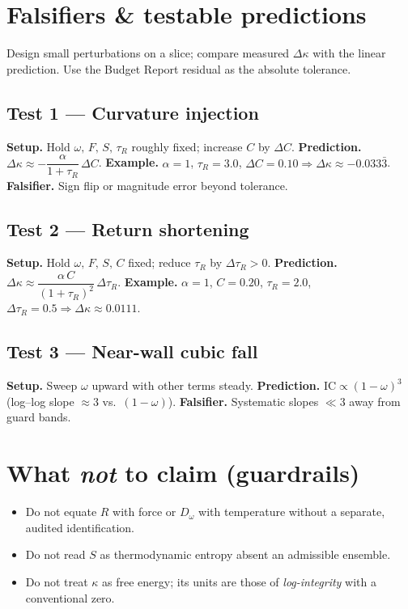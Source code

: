\section{Falsifiers \& testable predictions}
Design small perturbations on a slice; compare measured $\Delta\kappa$ with the linear prediction. Use the Budget Report residual as the absolute tolerance.

\subsection*{Test 1 — Curvature injection}
\textbf{Setup.} Hold $\omega,\,F,\,S,\,\tau_R$ roughly fixed; increase $C$ by $\Delta C$.  
\textbf{Prediction.} $\Delta\kappa \approx -\dfrac{\alpha}{1+\tau_R}\,\Delta C$.  
\textbf{Example.} $\alpha=1$, $\tau_R=3.0$, $\Delta C=0.10 \Rightarrow \Delta\kappa \approx -0.033\bar{3}$.  
\textbf{Falsifier.} Sign flip or magnitude error beyond tolerance.

\subsection*{Test 2 — Return shortening}
\textbf{Setup.} Hold $\omega,\,F,\,S,\,C$ fixed; reduce $\tau_R$ by $\Delta\tau_R>0$.  
\textbf{Prediction.} $\Delta\kappa \approx \dfrac{\alpha\,C}{(1+\tau_R)^2}\,\Delta\tau_R$.  
\textbf{Example.} $\alpha=1$, $C=0.20$, $\tau_R=2.0$, $\Delta\tau_R=0.5 \Rightarrow \Delta\kappa \approx 0.0111$.  

\subsection*{Test 3 — Near-wall cubic fall}
\textbf{Setup.} Sweep $\omega$ upward with other terms steady.  
\textbf{Prediction.} $\mathrm{IC}\propto (1-\omega)^3$ (log–log slope $\approx3$ vs.\ $(1-\omega)$).  
\textbf{Falsifier.} Systematic slopes $\ll3$ away from guard bands.

\section{What \emph{not} to claim (guardrails)}
\begin{itemize}[leftmargin=1.8em]
  \item Do not equate $R$ with force or $D_{\omega}$ with temperature without a separate, audited identification.
  \item Do not read $S$ as thermodynamic entropy absent an admissible ensemble.
  \item Do not treat $\kappa$ as free energy; its units are those of \emph{log-integrity} with a conventional zero.
\end{itemize}

